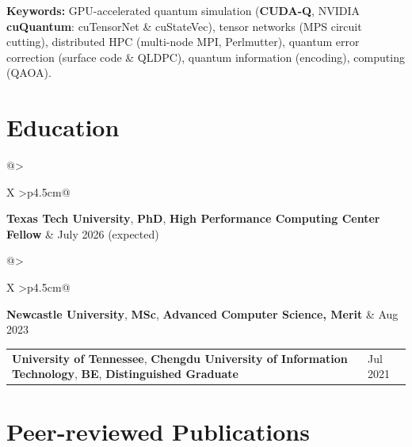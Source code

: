 \documentclass[10pt, letterpaper]{article}
\makeatletter
\newcommand{\datedentry}[2]{%
    \begin{tabularx}{\linewidth}{@{}>{\raggedright\arraybackslash}X
                                  >{\raggedleft\arraybackslash}p{4.5cm}@{}}
        #1 & #2
    \end{tabularx}%
}
\makeatother
\begin{document}
\vspace{0.15cm}
\noindent\textbf{Keywords:} GPU-accelerated quantum simulation (\textbf{CUDA-Q},
NVIDIA \textbf{cuQuantum}: cuTensorNet \& cuStateVec), tensor networks (MPS
circuit cutting), distributed HPC (multi-node MPI, Perlmutter), quantum error
correction (surface code \& QLDPC), quantum information (encoding), computing
(QAOA).

\section{Education}

\datedentry{\textbf{Texas Tech University}, \textbf{PhD}, \textbf{High Performance Computing Center Fellow}}{July 2026 (expected)}

\vspace{0.2cm}
\datedentry{\textbf{Newcastle University}, \textbf{MSc}, \textbf{Advanced Computer Science, Merit}}{Aug 2023}

\vspace{0.2cm}
\datedentry{\textbf{University of Tennessee}, \textbf{Chengdu University of Information Technology}, \textbf{BE}, \textbf{Distinguished Graduate}}{Jul 2021}

\section{Peer-reviewed Publications}
\end{document}
